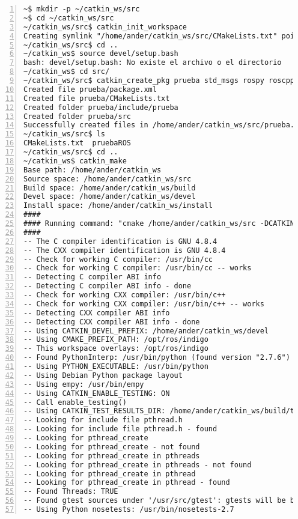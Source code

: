 	\begin{lstlisting}[style=consola,numbers=left]
~$ mkdir -p ~/catkin_ws/src
~$ cd ~/catkin_ws/src
~/catkin_ws/src$ catkin_init_workspace
Creating symlink "/home/ander/catkin_ws/src/CMakeLists.txt" pointing to "/opt/ros/indigo/share/catkin/cmake/toplevel.cmake"
~/catkin_ws/src$ cd ..
~/catkin_ws$ source devel/setup.bash
bash: devel/setup.bash: No existe el archivo o el directorio
~/catkin_ws$ cd src/
~/catkin_ws/src$ catkin_create_pkg prueba std_msgs rospy roscpp
Created file prueba/package.xml
Created file prueba/CMakeLists.txt
Created folder prueba/include/prueba
Created folder prueba/src
Successfully created files in /home/ander/catkin_ws/src/prueba. Please adjust the values in package.xml.
~/catkin_ws/src$ ls
CMakeLists.txt  pruebaROS
~/catkin_ws/src$ cd ..
~/catkin_ws$ catkin_make
Base path: /home/ander/catkin_ws
Source space: /home/ander/catkin_ws/src
Build space: /home/ander/catkin_ws/build
Devel space: /home/ander/catkin_ws/devel
Install space: /home/ander/catkin_ws/install
####
#### Running command: "cmake /home/ander/catkin_ws/src -DCATKIN_DEVEL_PREFIX=/home/ander/catkin_ws/devel -DCMAKE_INSTALL_PREFIX=/home/ander/catkin_ws/install -G Unix Makefiles" in "/home/ander/catkin_ws/build"
####
-- The C compiler identification is GNU 4.8.4
-- The CXX compiler identification is GNU 4.8.4
-- Check for working C compiler: /usr/bin/cc
-- Check for working C compiler: /usr/bin/cc -- works
-- Detecting C compiler ABI info
-- Detecting C compiler ABI info - done
-- Check for working CXX compiler: /usr/bin/c++
-- Check for working CXX compiler: /usr/bin/c++ -- works
-- Detecting CXX compiler ABI info
-- Detecting CXX compiler ABI info - done
-- Using CATKIN_DEVEL_PREFIX: /home/ander/catkin_ws/devel
-- Using CMAKE_PREFIX_PATH: /opt/ros/indigo
-- This workspace overlays: /opt/ros/indigo
-- Found PythonInterp: /usr/bin/python (found version "2.7.6")
-- Using PYTHON_EXECUTABLE: /usr/bin/python
-- Using Debian Python package layout
-- Using empy: /usr/bin/empy
-- Using CATKIN_ENABLE_TESTING: ON
-- Call enable_testing()
-- Using CATKIN_TEST_RESULTS_DIR: /home/ander/catkin_ws/build/test_results
-- Looking for include file pthread.h
-- Looking for include file pthread.h - found
-- Looking for pthread_create
-- Looking for pthread_create - not found
-- Looking for pthread_create in pthreads
-- Looking for pthread_create in pthreads - not found
-- Looking for pthread_create in pthread
-- Looking for pthread_create in pthread - found
-- Found Threads: TRUE  
-- Found gtest sources under '/usr/src/gtest': gtests will be built
-- Using Python nosetests: /usr/bin/nosetests-2.7

\end{lstlisting}
